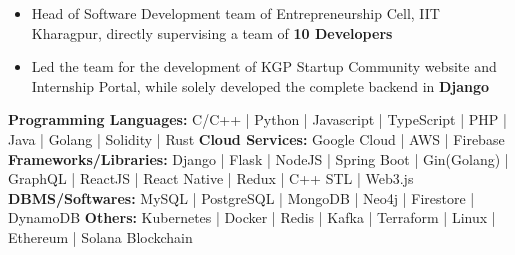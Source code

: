 \documentclass[10pt,a4paper,ragged2e,withhyper]{altacv}
\begin{document}
\begin{paracol}{2}









\hspace*{-1em}  %



\switchcolumn





\begin{itemize}
\item Head of Software Development team of Entrepreneurship Cell, IIT Kharagpur, directly supervising a team of {\bf 10 Developers}
\item Led the team for the development of KGP Startup Community website and Internship Portal, while solely developed the complete backend in {\bf Django}
\end{itemize}

{\bf Programming Languages:} 
C/C++ | Python | Javascript | TypeScript | PHP | Java | Golang | Solidity | Rust
\linebreak
{\bf Cloud Services:} 
Google Cloud | AWS | Firebase
\linebreak
{\bf Frameworks/Libraries:} 
Django | Flask | NodeJS | Spring Boot | Gin(Golang) | GraphQL | ReactJS | React Native | Redux | C++ STL | Web3.js
\linebreak
{\bf DBMS/Softwares:} 
MySQL | PostgreSQL | MongoDB | Neo4j | Firestore | DynamoDB
\linebreak
{\bf Others:} 
Kubernetes | Docker | Redis | Kafka | Terraform | Linux | Ethereum | Solana Blockchain







\end{paracol}
\end{document}
